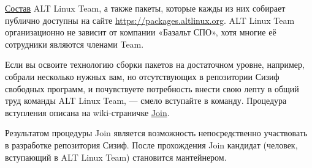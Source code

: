 \href{https://packages.altlinux.org/ru/sisyphus/maintainers/}{Состав} ALT Linux Team, 
а также пакеты, которые кажды из них собирает публично доступны на сайте \url{https://packages.altlinux.org}.
ALT Linux Team организационно не зависит от компании «Базальт СПО», 
хотя многие её сотрудники являются членами Team. 

Если вы освоите технологию сборки пакетов на достаточном уровне, например, собрали несколько нужных вам, 
но отсутствующих в репозитории Сизиф свободных программ, и почувствуете потребность внести свою лепту 
в общий труд команды ALT Linux Team, --- смело вступайте в команду. Процедура вступления описана на 
wiki-страничке \href{https://altlinux.org/Join}{Join}.

Результатом процедуры Join является возможность непосредственно участвовать в разработке репозитория Сизиф. 
После прохождения Join кандидат (человек, вступающий в ALT Linux Team) становится мантейнером.
